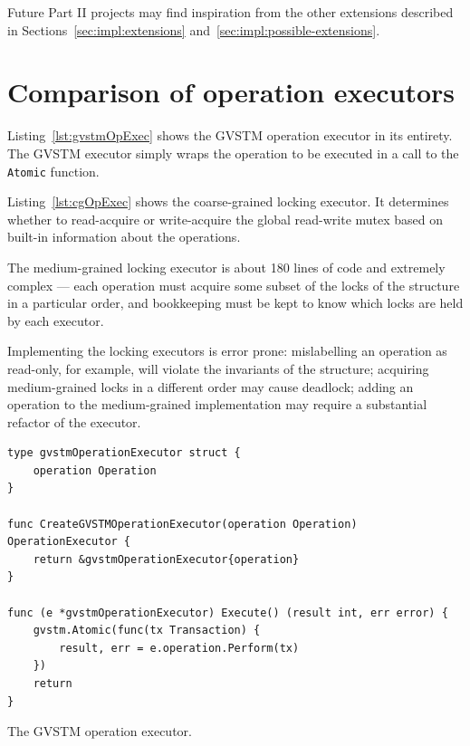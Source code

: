 \documentclass[12pt,a4paper,oneside,openright]{report}
\newcommand{\mycaption}[2]{\caption[#1]{#1 #2}}
\newcommand{\goFunc}[1]{\texttt{#1}}
\begin{document}
Future Part II projects may find inspiration from the other extensions
described in Sections~\ref{sec:impl:extensions}
and~\ref{sec:impl:possible-extensions}.



\appendix
{}

\chapter{Comparison of operation executors}
\label{cha:comp-oper-exec}

Listing~\ref{lst:gvstmOpExec} shows the GVSTM operation executor in
its entirety. The GVSTM executor simply wraps the operation to be
executed in a call to the \goFunc{Atomic} function.

Listing~\ref{lst:cgOpExec} shows the coarse-grained locking
executor. It determines whether to read-acquire or write-acquire the
global read-write mutex based on built-in information about the
operations.

The medium-grained locking executor is about 180 lines of code and
extremely complex --- each operation must acquire some subset of the
locks of the structure in a particular order, and bookkeeping must be
kept to know which locks are held by each executor.

Implementing the locking executors is error prone: mislabelling an
operation as read-only, for example, will violate the invariants of
the structure; acquiring medium-grained locks in a different order may
cause deadlock; adding an operation to the medium-grained
implementation may require a substantial refactor of the executor.

\begin{Listing}[hbtp]
\begin{lstlisting}
type gvstmOperationExecutor struct {
	operation Operation
}

func CreateGVSTMOperationExecutor(operation Operation) OperationExecutor {
	return &gvstmOperationExecutor{operation}
}

func (e *gvstmOperationExecutor) Execute() (result int, err error) {
	gvstm.Atomic(func(tx Transaction) {
		result, err = e.operation.Perform(tx)
	})
	return
}
\end{lstlisting}

  \mycaption{The GVSTM operation executor.}{}
  \label{lst:gvstmOpExec}
\end{Listing}
\end{document}
